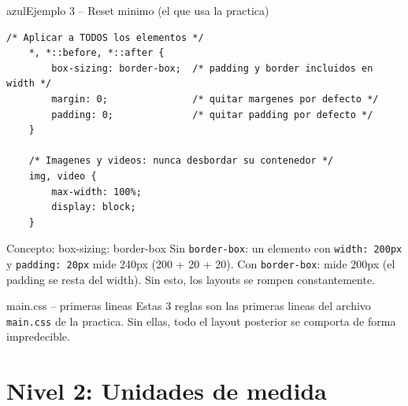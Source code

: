 \documentclass[11pt,a4paper]{article}
\begin{document}
	\begin{cajacodigo}{azul}{Ejemplo 3 -- Reset minimo (el que usa la practica)}
		\begin{lstlisting}[style=codecss]
	/* Aplicar a TODOS los elementos */
	*, *::before, *::after {
		box-sizing: border-box;  /* padding y border incluidos en width */
		margin: 0;               /* quitar margenes por defecto */
		padding: 0;              /* quitar padding por defecto */
	}
	
	/* Imagenes y videos: nunca desbordar su contenedor */
	img, video {
		max-width: 100%;
		display: block;
	} \end{lstlisting}
	\end{cajacodigo}
	
	\begin{cajaconcepto}{Concepto: box-sizing: border-box}
		Sin \texttt{border-box}: un elemento con \texttt{width: 200px} y \texttt{padding: 20px} mide 240px (200 + 20 + 20). Con \texttt{border-box}: mide 200px (el padding se resta del width). Sin esto, los layouts se rompen constantemente.
	\end{cajaconcepto}
	
	\begin{cajapractica}{main.css -- primeras lineas}
		Estas 3 reglas son las primeras lineas del archivo \texttt{main.css} de la practica. Sin ellas, todo el layout posterior se comporta de forma impredecible.
	\end{cajapractica}
	
	\section{Nivel 2: Unidades de medida}
	
\end{document}
